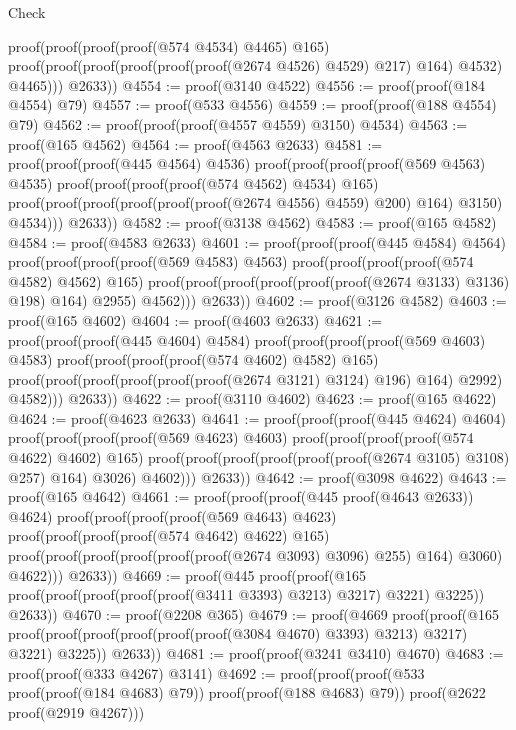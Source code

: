 \begin{lexlean}{Check}
\begin{coremodule}
            proof(proof(proof(proof(@574 @4534) @4465) @165)
                proof(proof(proof(proof(proof(proof(@2674 @4526) @4529) @217) @164) @4532) @4465)))
          @2633))
@4554 := proof(@3140 @4522)
@4556 := proof(proof(@184 @4554) @79)
@4557 := proof(@533 @4556)
@4559 := proof(proof(@188 @4554) @79)
@4562 := proof(proof(proof(@4557 @4559) @3150) @4534)
@4563 := proof(@165 @4562)
@4564 := proof(@4563 @2633)
@4581 := proof(proof(proof(@445 @4564) @4536)
      proof(proof(proof(proof(@569 @4563) @4535)
            proof(proof(proof(proof(@574 @4562) @4534) @165)
                proof(proof(proof(proof(proof(proof(@2674 @4556) @4559) @200) @164) @3150) @4534)))
          @2633))
@4582 := proof(@3138 @4562)
@4583 := proof(@165 @4582)
@4584 := proof(@4583 @2633)
@4601 := proof(proof(proof(@445 @4584) @4564)
      proof(proof(proof(proof(@569 @4583) @4563)
            proof(proof(proof(proof(@574 @4582) @4562) @165)
                proof(proof(proof(proof(proof(proof(@2674 @3133) @3136) @198) @164) @2955) @4562)))
          @2633))
@4602 := proof(@3126 @4582)
@4603 := proof(@165 @4602)
@4604 := proof(@4603 @2633)
@4621 := proof(proof(proof(@445 @4604) @4584)
      proof(proof(proof(proof(@569 @4603) @4583)
            proof(proof(proof(proof(@574 @4602) @4582) @165)
                proof(proof(proof(proof(proof(proof(@2674 @3121) @3124) @196) @164) @2992) @4582)))
          @2633))
@4622 := proof(@3110 @4602)
@4623 := proof(@165 @4622)
@4624 := proof(@4623 @2633)
@4641 := proof(proof(proof(@445 @4624) @4604)
      proof(proof(proof(proof(@569 @4623) @4603)
            proof(proof(proof(proof(@574 @4622) @4602) @165)
                proof(proof(proof(proof(proof(proof(@2674 @3105) @3108) @257) @164) @3026) @4602)))
          @2633))
@4642 := proof(@3098 @4622)
@4643 := proof(@165 @4642)
@4661 := proof(proof(proof(@445 proof(@4643 @2633)) @4624)
      proof(proof(proof(proof(@569 @4643) @4623)
            proof(proof(proof(proof(@574 @4642) @4622) @165)
                proof(proof(proof(proof(proof(proof(@2674 @3093) @3096) @255) @164) @3060) @4622)))
          @2633))
@4669 := proof(@445
      proof(proof(@165 proof(proof(proof(proof(proof(@3411 @3393) @3213) @3217) @3221) @3225))
          @2633))
@4670 := proof(@2208 @365)
@4679 := proof(@4669
      proof(proof(@165
            proof(proof(proof(proof(proof(proof(@3084 @4670) @3393) @3213) @3217) @3221) @3225))
          @2633))
@4681 := proof(proof(@3241 @3410) @4670)
@4683 := proof(proof(@333 @4267) @3141)
@4692 := proof(proof(proof(@533 proof(proof(@184 @4683) @79)) proof(proof(@188 @4683) @79))
      proof(@2622 proof(@2919 @4267)))

\end{coremodule}
\end{lexlean}
